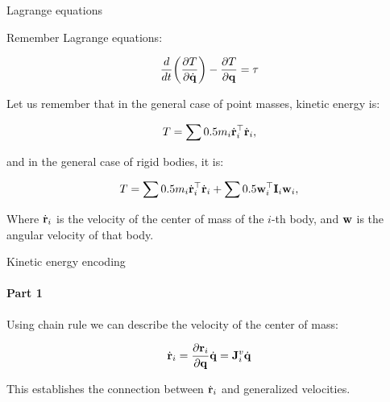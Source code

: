 \documentclass{beamer}
\begin{document}
\begin{frame}{Lagrange equations}
\begin{flushleft}

Remember Lagrange equations:

\begin{equation}
\label{eq:Lagrange}
    \frac{d}{dt} \bigg( 
    \frac{\partial T }{\partial \dot{\mathbf{q}}}
    \bigg) - 
    \frac{\partial T }{\partial \mathbf{q}} = \tau
\end{equation}

Let us remember that in the general case of point masses, kinetic energy is:

\begin{equation}
\label{eq:kinetic_energy}
    T = \sum 0.5 m_i \dot{\mathbf{r}}_i^\top \dot{\mathbf{r}}_i,
\end{equation}

and in the general case of rigid bodies, it is:

\begin{equation}
\label{eq:kinetic_energy_rigid_body}
    T = \sum 0.5 m_i \dot{\mathbf{r}}_i^\top \dot{\mathbf{r}}_i + \sum 0.5 \mathbf{w}_i^\top \mathbf{I}_i \mathbf{w}_i,
\end{equation}

Where $\dot{\mathbf{r}}_i$ is the velocity of the center of mass of the $i$-th body, and $\mathbf{w}$ is the angular velocity of that body.

\end{flushleft}
\end{frame}




\begin{frame}{Kinetic energy encoding}
\framesubtitle{Part 1}
\begin{flushleft}

Using chain rule we can describe the velocity of the center of mass:

\begin{equation}
\dot{\mathbf{r}}_i = \frac{\partial \mathbf{r}_i }{\partial {\mathbf{q}}} \dot{\mathbf{q}} = \mathbf{J}^v_i \dot{\mathbf{q}}
\end{equation}

This establishes the connection between $\dot{\mathbf{r}}_i$ and generalized velocities.

\end{flushleft}
\end{frame}
\end{document}
